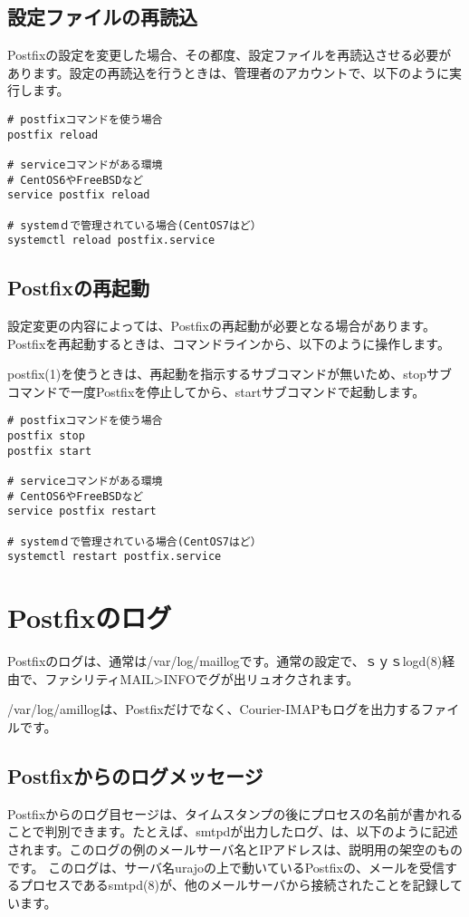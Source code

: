 \subsection{設定ファイルの再読込}
Postfixの設定を変更した場合、その都度、設定ファイルを再読込させる必要があります。設定の再読込を行うときは、管理者のアカウントで、以下のように実行します。

\begin{lstlisting}[basicstyle=\ttfamily\footnotesize, frame=single]
# postfixコマンドを使う場合
postfix reload

# serviceコマンドがある環境
# CentOS6やFreeBSDなど
service postfix reload

# systemｄで管理されている場合(CentOS7はど）
systemctl reload postfix.service
\end{lstlisting}

\subsection{Postfixの再起動}
設定変更の内容によっては、Postfixの再起動が必要となる場合があります。Postfixを再起動するときは、コマンドラインから、以下のように操作します。

postfix(1)を使うときは、再起動を指示するサブコマンドが無いため、stopサブコマンドで一度Postfixを停止してから、startサブコマンドで起動します。

\begin{lstlisting}[basicstyle=\ttfamily\footnotesize, frame=single]
# postfixコマンドを使う場合
postfix stop
postfix start

# serviceコマンドがある環境
# CentOS6やFreeBSDなど
service postfix restart

# systemｄで管理されている場合(CentOS7はど）
systemctl restart postfix.service
\end{lstlisting}

\section{Postfixのログ}
Postfixのログは、通常は/var/log/maillogです。通常の設定で、ｓｙｓlogd(8)経由で、ファシリティMAIL>INFOでグが出リュオクされます。

/var/log/amillogは、Postfixだけでなく、Courier-IMAPもログを出力するファイルです。

\subsection{Postfixからのログメッセージ}
Postfixからのログ目セージは、タイムスタンプの後にプロセスの名前が書かれることで判別できます。たとえば、smtpdが出力したログ、は、以下のように記述されます。このログの例のメールサーバ名とIPアドレスは、説明用の架空のものです。
このログは、サーバ名urajoの上で動いているPostfixの、メールを受信するプロセスであるsmtpd(8)が、他のメールサーバから接続されたことを記録しています。

